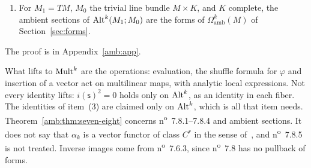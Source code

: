 \begin{theorem}
\begin{enumerate}
\begin{enumerate}
\item for $k\ge1$ the interior product $i$ is a bilinear operation from $M_1$ and $\Alt^k(M_1;\mathsf A)$ to $\Alt^{k-1}(M_1;\mathsf A)$ (n\textsuperscript{o}~7.8.4), and Bourbaki's formulas (1)--(7) of n\textsuperscript{o}~7.8.2--7.8.4 hold;
\item for analytic $\gamma\colon M'\to M$, the bundle $\Alt^k(\gamma^*M_1;\gamma^*M_0)$ is the inverse image of the filtered bundle $\Alt^k(M_1;M_0)$, with transitions $\Theta_{\mathsf{ab}}\circ\gamma$, and $\omega\circ\gamma$ is an ambient section of it for ambient $\omega$ (n\textsuperscript{o}~7.6.3).
\end{enumerate}
\item For $M_1=TM$, $M_0$ the trivial line bundle $M\times K$, and $K$ complete, the ambient sections of $\Alt^k(M_1;M_0)$ are the forms of $\Omega^k_{\mathrm{amb}}(M)$ of Section~\ref{sec:forms}.
\end{enumerate}
\end{theorem}

The proof is in Appendix~\ref{amb:app}.

What lifts to $\operatorname{Mult}^k$ are the operations: evaluation, the shuffle formula for $\varphi$ and insertion of a vector act on multilinear maps, with analytic local expressions. Not every identity lifts: $i(\mathsf s)^2=0$ holds only on $\operatorname{Alt}^k$, as an identity in each fiber. The identities of item~(3) are claimed only on $\operatorname{Alt}^k$, which is all that item needs. Theorem~\ref{amb:thm:seven-eight} concerns n\textsuperscript{o}~7.8.1--7.8.4 and ambient sections. It does not say that $\alpha_k$ is a vector functor of class $C^r$ in the sense of~\cite[n\textsuperscript{o}~7.6.1]{Bou}, and n\textsuperscript{o}~7.8.5 is not treated. Inverse images come from n\textsuperscript{o}~7.6.3, since n\textsuperscript{o}~7.8 has no pullback of forms.

